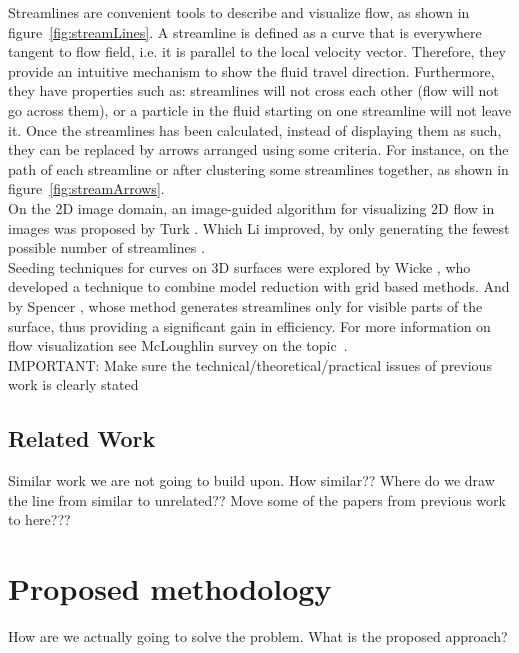 \documentclass[11pt]{report}
\begin{document}
Streamlines are convenient tools to describe and visualize flow, as shown in figure~\ref{fig:streamLines}.
A streamline is defined as a curve that is everywhere tangent to flow field, i.e. it is parallel to the local velocity vector.
Therefore, they provide an intuitive mechanism to show the fluid travel direction.
Furthermore, they have properties such as: streamlines will not cross each other (flow will not go across them), or a particle in the fluid starting on one streamline will not leave it.
Once the streamlines has been calculated, instead of displaying them as such, they can be replaced by arrows arranged using some criteria.
For instance, on the path of each streamline or after clustering some streamlines together, as shown in figure~\ref{fig:streamArrows}.\\

On the 2D image domain, an image-guided algorithm for visualizing 2D flow in images was proposed by Turk \cite{Turk1996}.
Which Li improved, by only generating the fewest possible number of streamlines \cite{Li2008}. \\

Seeding techniques for curves on 3D surfaces were explored by Wicke \cite{Wicke2009}, who developed a technique to combine model reduction with grid based methods.
And by Spencer \cite{Spencer2009}, whose method generates streamlines only for visible parts of the surface, thus providing a significant gain in efficiency.
For more information on flow visualization see McLoughlin survey on the topic~\cite{McLoughlin2010}.\\


IMPORTANT: Make sure the technical/theoretical/practical issues of previous work is clearly stated 
\section{Related Work}

Similar work we are not going to build upon.
How similar?? 
Where do we draw the line from similar to unrelated??
Move some of the papers from previous work to here???

\chapter{Proposed methodology}

How are we actually going to solve the problem.
What is the proposed approach?
\end{document}
